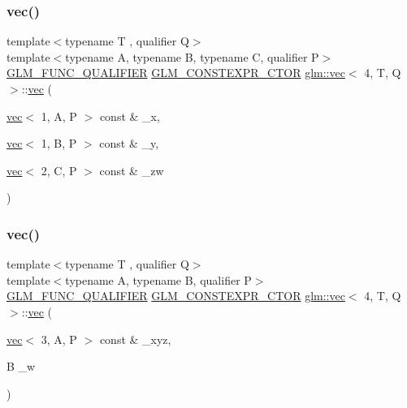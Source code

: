 \mbox{\label{structglm_1_1vec_3_014_00_01_t_00_01_q_01_4_ab16d5c7c6e22f08e197088a9535a114b}} 
\subsubsection{\texorpdfstring{vec()}{vec()}\hspace{0.1cm}{\footnotesize\ttfamily [28/34]}}
{\footnotesize\ttfamily template$<$typename T , qualifier Q$>$ \\
template$<$typename A, typename B, typename C, qualifier P$>$ \\
\hyperlink{setup_8hpp_a33fdea6f91c5f834105f7415e2a64407}{G\+L\+M\+\_\+\+F\+U\+N\+C\+\_\+\+Q\+U\+A\+L\+I\+F\+I\+ER} \hyperlink{setup_8hpp_ad34178a09666081abdb573c14d1f4a5a}{G\+L\+M\+\_\+\+C\+O\+N\+S\+T\+E\+X\+P\+R\+\_\+\+C\+T\+OR} \hyperlink{structglm_1_1vec}{glm\+::vec}$<$ 4, T, Q $>$\+::\hyperlink{structglm_1_1vec}{vec} (\begin{DoxyParamCaption}\item[{\hyperlink{structglm_1_1vec}{vec}$<$ 1, A, P $>$ const \&}]{\+\_\+x,  }\item[{\hyperlink{structglm_1_1vec}{vec}$<$ 1, B, P $>$ const \&}]{\+\_\+y,  }\item[{\hyperlink{structglm_1_1vec}{vec}$<$ 2, C, P $>$ const \&}]{\+\_\+zw }\end{DoxyParamCaption})}

\mbox{\label{structglm_1_1vec_3_014_00_01_t_00_01_q_01_4_adf93c96aee6aa7910fb218b3d0cb8697}} 
\subsubsection{\texorpdfstring{vec()}{vec()}\hspace{0.1cm}{\footnotesize\ttfamily [29/34]}}
{\footnotesize\ttfamily template$<$typename T , qualifier Q$>$ \\
template$<$typename A, typename B, qualifier P$>$ \\
\hyperlink{setup_8hpp_a33fdea6f91c5f834105f7415e2a64407}{G\+L\+M\+\_\+\+F\+U\+N\+C\+\_\+\+Q\+U\+A\+L\+I\+F\+I\+ER} \hyperlink{setup_8hpp_ad34178a09666081abdb573c14d1f4a5a}{G\+L\+M\+\_\+\+C\+O\+N\+S\+T\+E\+X\+P\+R\+\_\+\+C\+T\+OR} \hyperlink{structglm_1_1vec}{glm\+::vec}$<$ 4, T, Q $>$\+::\hyperlink{structglm_1_1vec}{vec} (\begin{DoxyParamCaption}\item[{\hyperlink{structglm_1_1vec}{vec}$<$ 3, A, P $>$ const \&}]{\+\_\+xyz,  }\item[{B}]{\+\_\+w }\end{DoxyParamCaption})}


